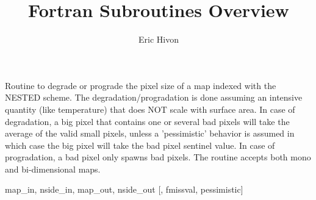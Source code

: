 
\sloppy


\title{\healpix Fortran Subroutines Overview}
 \section[udgrade\_nest*]{ }
\label{sub:udgrade_nest}
\author{Eric Hivon}


\begin{facility}
{Routine to degrade or prograde the pixel size of a \healpix map indexed with
  the NESTED scheme. The degradation/progradation is done assuming an
intensive quantity (like temperature) that does NOT scale with surface area. \newline
In case of degradation, a big pixel that contains one or several bad pixels will
take the average of the valid small pixels, unless a 'pessimistic' behavior
is assumed in which case the big pixel will take the bad pixel sentinel value.
In case of progradation, a bad pixel only spawns bad pixels. \newline
The routine accepts both mono and bi-dimensional maps.
}
{\modUdgradeNr}
\end{facility}

\begin{f90format}
{map\_in, nside\_in, map\_out, nside\_out [, fmissval, pessimistic]}
\end{f90format}

